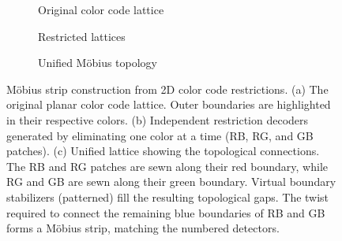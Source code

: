 \documentclass{article}
\begin{document}
\begin{figure}[htbp]
    \centering
    \begin{subfigure}[b]{0.27\textwidth}
        \centering
        \resizebox{\linewidth}{!}{}
        \caption{Original color code lattice}
        \label{fig:mobius_a}
    \end{subfigure}
    \hfill
    \begin{subfigure}[b]{0.27\textwidth}
        \centering
        \resizebox{\linewidth}{!}{}
        \caption{Restricted lattices}
        \label{fig:mobius_b}
    \end{subfigure}
    \hfill
    \begin{subfigure}[b]{0.4\textwidth}
        \centering
        \resizebox{\linewidth}{!}{}
        \caption{Unified M\"obius topology}
        \label{fig:mobius_c}
    \end{subfigure}
    \caption[M\"obius strip construction from 2D color code restrictions]{
        M\"obius strip construction from 2D color code restrictions. 
        (a) The original planar color code lattice. Outer boundaries are highlighted in their respective colors.
        (b) Independent restriction decoders generated by eliminating one color at a time (RB, RG, and GB patches).
        (c) Unified lattice showing the topological connections. The RB and RG patches are sewn along their red boundary, while RG and GB are sewn along their green boundary. Virtual boundary stabilizers (patterned) fill the resulting topological gaps. The twist required to connect the remaining blue boundaries of RB and GB forms a M\"obius strip, matching the numbered detectors.
    }
    \label{fig:mobius_unified_lattice}
\end{figure}
\end{document}
